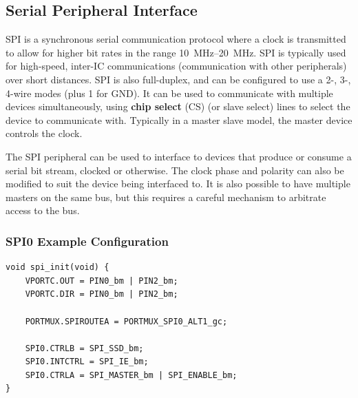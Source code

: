 \documentclass{report}
\begin{document}
\subsection{Serial Peripheral Interface}
SPI is a synchronous serial communication protocol where a clock is transmitted
to allow for higher bit rates in the range \qtyrange{10}{20}{MHz}. SPI is typically
used for high-speed, inter-IC communications (communication with other peripherals) over short distances.
SPI is also \linebreak full-duplex, and can be configured to use a 2-, 3-, 4-wire modes (plus 1 for GND).
It can be used to communicate with multiple devices simultaneously, using
\textbf{chip select} (CS) (or slave select) lines to select the device to communicate with.
Typically in a master slave model, the master device controls the clock.

The SPI peripheral can be used to interface to devices that produce or consume a serial bit stream, clocked or otherwise.
The clock phase and polarity can also be modified to suit the device being interfaced to. It is also possible to have multiple
masters on the same bus, but this requires a careful mechanism to arbitrate access to the bus.
\subsubsection{SPI0 Example Configuration}
\begin{verbatim}
void spi_init(void) {
    VPORTC.OUT = PIN0_bm | PIN2_bm;
    VPORTC.DIR = PIN0_bm | PIN2_bm;

    PORTMUX.SPIROUTEA = PORTMUX_SPI0_ALT1_gc;

    SPI0.CTRLB = SPI_SSD_bm;
    SPI0.INTCTRL = SPI_IE_bm;
    SPI0.CTRLA = SPI_MASTER_bm | SPI_ENABLE_bm;
}
\end{verbatim}
\end{document}
